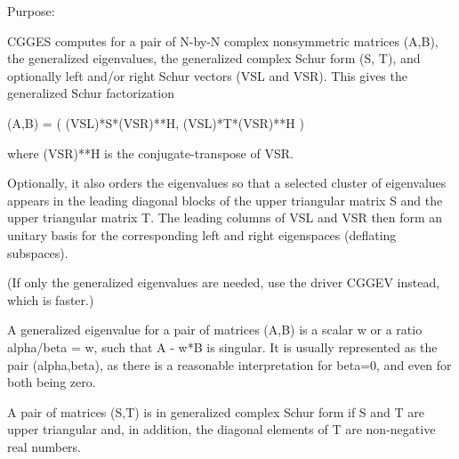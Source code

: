  \begin{DoxyParagraph}{Purpose\+: }
\begin{DoxyVerb} CGGES computes for a pair of N-by-N complex nonsymmetric matrices
 (A,B), the generalized eigenvalues, the generalized complex Schur
 form (S, T), and optionally left and/or right Schur vectors (VSL
 and VSR). This gives the generalized Schur factorization

         (A,B) = ( (VSL)*S*(VSR)**H, (VSL)*T*(VSR)**H )

 where (VSR)**H is the conjugate-transpose of VSR.

 Optionally, it also orders the eigenvalues so that a selected cluster
 of eigenvalues appears in the leading diagonal blocks of the upper
 triangular matrix S and the upper triangular matrix T. The leading
 columns of VSL and VSR then form an unitary basis for the
 corresponding left and right eigenspaces (deflating subspaces).

 (If only the generalized eigenvalues are needed, use the driver
 CGGEV instead, which is faster.)

 A generalized eigenvalue for a pair of matrices (A,B) is a scalar w
 or a ratio alpha/beta = w, such that  A - w*B is singular.  It is
 usually represented as the pair (alpha,beta), as there is a
 reasonable interpretation for beta=0, and even for both being zero.

 A pair of matrices (S,T) is in generalized complex Schur form if S
 and T are upper triangular and, in addition, the diagonal elements
 of T are non-negative real numbers.\end{DoxyVerb}
 
\end{DoxyParagraph}


